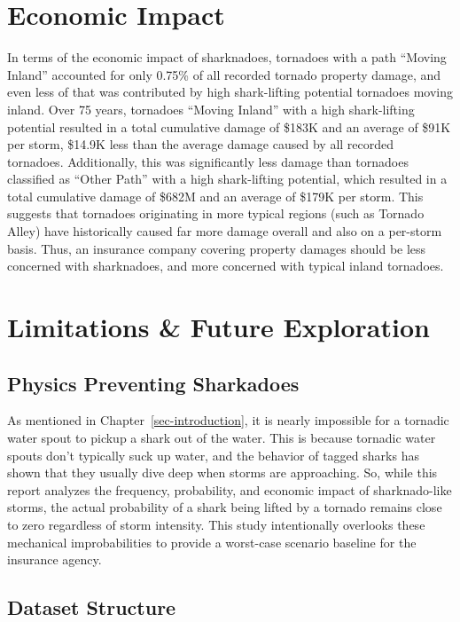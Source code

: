 \documentclass[
  letterpaper,
  DIV=11,
  numbers=noendperiod]{scrreprt}
\begin{document}
\section{Economic Impact}\label{economic-impact-1}

In terms of the economic impact of sharknadoes, tornadoes with a path
``Moving Inland'' accounted for only 0.75\% of all recorded tornado
property damage, and even less of that was contributed by high
shark-lifting potential tornadoes moving inland. Over 75 years,
tornadoes ``Moving Inland'' with a high shark-lifting potential resulted
in a total cumulative damage of \$183K and an average of \$91K per
storm, \$14.9K less than the average damage caused by all recorded
tornadoes. Additionally, this was significantly less damage than
tornadoes classified as ``Other Path'' with a high shark-lifting
potential, which resulted in a total cumulative damage of \$682M and an
average of \$179K per storm. This suggests that tornadoes originating in
more typical regions (such as Tornado Alley) have historically caused
far more damage overall and also on a per-storm basis. Thus, an
insurance company covering property damages should be less concerned
with sharknadoes, and more concerned with typical inland tornadoes.

\section{Limitations \& Future Exploration}\label{sec-limitations}

\subsection{Physics Preventing
Sharkadoes}\label{physics-preventing-sharkadoes}

As mentioned in Chapter~\ref{sec-introduction}, it is nearly impossible
for a tornadic water spout to pickup a shark out of the water. This is
because tornadic water spouts don't typically suck up water, and the
behavior of tagged sharks has shown that they usually dive deep when
storms are approaching. So, while this report analyzes the frequency,
probability, and economic impact of sharknado-like storms, the actual
probability of a shark being lifted by a tornado remains close to zero
regardless of storm intensity. This study intentionally overlooks these
mechanical improbabilities to provide a worst-case scenario baseline for
the insurance agency.

\subsection{Dataset Structure}\label{dataset-structure}
\end{document}
